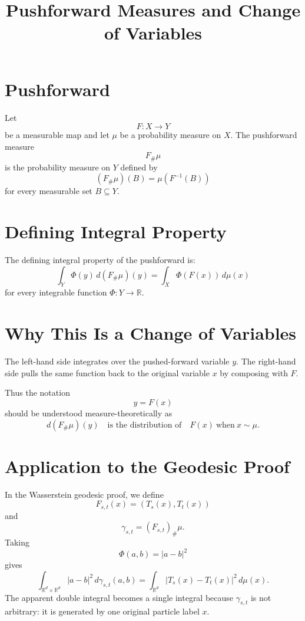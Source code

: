 \documentclass[11pt]{article}
\title{Pushforward Measures and Change of Variables}
\author{}
\date{}
\begin{document}
\maketitle

\section*{Pushforward}

Let
\[
F:X\to Y
\]
be a measurable map and let $\mu$ be a probability measure on $X$. The
pushforward measure
\[
F_\#\mu
\]
is the probability measure on $Y$ defined by
\[
(F_\#\mu)(B)=\mu(F^{-1}(B))
\]
for every measurable set $B\subseteq Y$.

\section*{Defining Integral Property}

The defining integral property of the pushforward is:
\[
\int_Y \Phi(y)\,d(F_\#\mu)(y)
=
\int_X \Phi(F(x))\,d\mu(x)
\]
for every integrable function $\Phi:Y\to\mathbb R$.

\section*{Why This Is a Change of Variables}

The left-hand side integrates over the pushed-forward variable $y$. The
right-hand side pulls the same function back to the original variable $x$ by
composing with $F$.

Thus the notation
\[
y=F(x)
\]
should be understood measure-theoretically as
\[
d(F_\#\mu)(y)
\quad\text{is the distribution of}\quad
F(x)\ \text{when}\ x\sim\mu.
\]

\section*{Application to the Geodesic Proof}

In the Wasserstein geodesic proof, we define
\[
F_{s,t}(x)=(T_s(x),T_t(x))
\]
and
\[
\gamma_{s,t}=(F_{s,t})_\#\mu.
\]
Taking
\[
\Phi(a,b)=|a-b|^2
\]
gives
\[
\int_{\mathbb R^d\times\mathbb R^d}
|a-b|^2\,d\gamma_{s,t}(a,b)
=
\int_{\mathbb R^d}
|T_s(x)-T_t(x)|^2\,d\mu(x).
\]
The apparent double integral becomes a single integral because
$\gamma_{s,t}$ is not arbitrary: it is generated by one original particle
label $x$.
\end{document}
